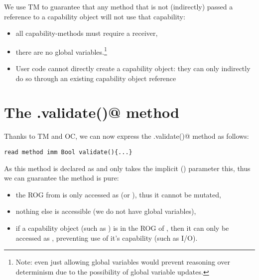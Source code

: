 We use TM to guarantee that any method that is not (indirectly) passed a \Q@mut@ reference to a capability object will not use that capability:
\begin{itemize}
\item all capability-methods must require a \Q@mut@ receiver,
\item there are no global variables.\footnote{Note: even just allowing \Q@imm@
global variables would prevent reasoning over determinism due to the possibility of global variable updates.}
\item User code cannot directly create a capability object: they can only indirectly do so through an existing \Q@mut@ capability object reference

\end{itemize}






\section{The \Q@.validate()@ method}

Thanks to TM and OC, we can now express the \Q@.validate()@ method as follows:
\saveSpace
\begin{lstlisting}
read method imm Bool validate(){...}
\end{lstlisting}
\saveSpace

As this method is declared as \Q@read@ and only takes the implicit (\Q@read@) parameter this, thus we can guarantee the method is pure:
\begin{itemize}
\item the ROG from \Q@this@ is only accessed as \Q@read@ (or \Q@imm@), thus it cannot be mutated,
\item nothing else is accessible (we do not have global variables),
\item if a capability object (such as \Q@System@) is in the ROG of \Q@this@, then it can only be accessed as \Q@read@, preventing use of it's capability (such as I/O).
\end{itemize}

